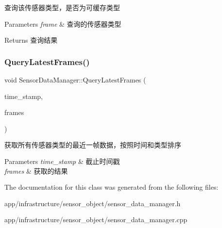 查询该传感器类型，是否为可缓存类型 


\begin{DoxyParams}{Parameters}
{\em frame} & 查询的传感器类型 \\
\hline
\end{DoxyParams}
\begin{DoxyReturn}{Returns}
查询结果 
\end{DoxyReturn}
\mbox{\label{classSensorDataManager_ab08f7ee7b52dc79ae4ac201a7cb8ef74}} 
\subsubsection{\texorpdfstring{Query\+Latest\+Frames()}{QueryLatestFrames()}}
{\footnotesize\ttfamily void Sensor\+Data\+Manager\+::\+Query\+Latest\+Frames (\begin{DoxyParamCaption}\item[{const uint32\+\_\+t}]{time\+\_\+stamp,  }\item[{std\+::vector$<$ Sensor\+Frame $>$ \&}]{frames }\end{DoxyParamCaption})}



获取所有传感器类型的最近一帧数据，按照时间和类型排序 


\begin{DoxyParams}{Parameters}
{\em time\+\_\+stamp} & 截止时间戳 \\
\hline
{\em frames} & 获取的结果 \\
\hline
\end{DoxyParams}


The documentation for this class was generated from the following files\+:\begin{DoxyCompactItemize}
\item 
app/infrastructure/sensor\+\_\+object/sensor\+\_\+data\+\_\+manager.\+h\item 
app/infrastructure/sensor\+\_\+object/sensor\+\_\+data\+\_\+manager.\+cpp\end{DoxyCompactItemize}
